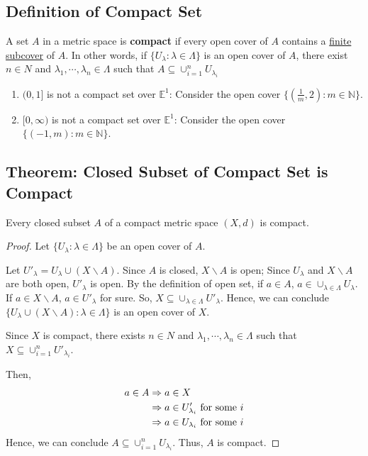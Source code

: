 \documentclass[11pt]{elegantbook}
\begin{document}
\subsection{Definition of Compact Set}
\begin{definition}
    \normalfont
    A set $A$ in a metric space is \textbf{compact} if every open cover of $A$ contains a \underline{finite subcover} of $A$. In other words, if $\{U_\lambda : \lambda \in \Lambda\}$ is an open cover of $A$, there exist $n \in N$ and $\lambda_1, \cdots , \lambda_n \in \Lambda$ such that $A\subseteq \cup_{i=1}^nU_{\lambda_i}$
\end{definition}
\begin{example}
    \begin{enumerate}
        \item $(0,1]$ is not a compact set over $\mathbb{E}^1$: Consider the open cover $\{(\frac{1}{m},2):m\in \mathbb{N}\}$.
        \item $[0,\infty)$ is not a compact set over $\mathbb{E}^1$: Consider the open cover $\{(-1,m):m\in \mathbb{N}\}$.
    \end{enumerate}
\end{example}

\subsection{Theorem: Closed Subset of Compact Set is Compact}
\begin{theorem}
    Every closed subset $A$ of a compact metric space $(X, d)$ is compact.
\end{theorem}
\begin{proof}
    Let $\{U_\lambda : \lambda \in \Lambda\}$ be an open cover of $A$.

    Let $U'_\lambda=U_\lambda \cup (X\backslash A)$. Since $A$ is closed, $X\backslash A$ is open; Since $U_\lambda$ and $X\backslash A$ are both open, $U'_\lambda$ is open. By the definition of open set, if $a\in A$, $a\in \cup_{\lambda\in\Lambda}U_\lambda$. If $a\in X\backslash A$, $a\in U'_\lambda$ for sure. So, $X\subseteq \cup_{\lambda\in\Lambda}U'_\lambda$. Hence, we can conclude $\{U_\lambda \cup (X\backslash A) : \lambda \in \Lambda\}$ is an open cover of $X$.

    Since $X$ is compact, there exists $n \in N$ and $\lambda_1, \cdots , \lambda_n \in \Lambda$ such that $X\subseteq \cup_{i=1}^nU'_{\lambda_i}$.

    Then,
    \begin{equation}
        \begin{aligned}
            a\in A &\Rightarrow a\in X\\
            &\Rightarrow a\in U'_{\lambda_i} \textnormal{ for some }i\\
            & \Rightarrow a\in U_{\lambda_i} \textnormal{ for some }i
        \end{aligned}
        \nonumber
    \end{equation}
    Hence, we can conclude $A\subseteq \cup_{i=1}^nU_{\lambda_i}$. Thus, $A$ is compact.
\end{proof}
\end{document}
